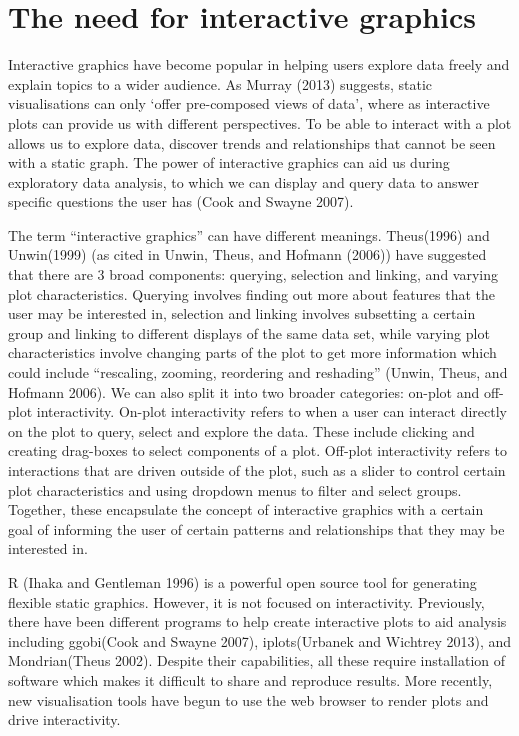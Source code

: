 \documentclass[11pt,]{report}
\begin{document}
\section{The need for interactive
graphics}\label{the-need-for-interactive-graphics}

Interactive graphics have become popular in helping users explore data
freely and explain topics to a wider audience. As Murray (2013)
suggests, static visualisations can only `offer pre-composed views of
data', where as interactive plots can provide us with different
perspectives. To be able to interact with a plot allows us to explore
data, discover trends and relationships that cannot be seen with a
static graph. The power of interactive graphics can aid us during
exploratory data analysis, to which we can display and query data to
answer specific questions the user has (Cook and Swayne 2007).

The term ``interactive graphics'' can have different meanings.
Theus(1996) and Unwin(1999) (as cited in Unwin, Theus, and Hofmann
(2006)) have suggested that there are 3 broad components: querying,
selection and linking, and varying plot characteristics. Querying
involves finding out more about features that the user may be interested
in, selection and linking involves subsetting a certain group and
linking to different displays of the same data set, while varying plot
characteristics involve changing parts of the plot to get more
information which could include ``rescaling, zooming, reordering and
reshading'' (Unwin, Theus, and Hofmann 2006). We can also split it into
two broader categories: on-plot and off-plot interactivity. On-plot
interactivity refers to when a user can interact directly on the plot to
query, select and explore the data. These include clicking and creating
drag-boxes to select components of a plot. Off-plot interactivity refers
to interactions that are driven outside of the plot, such as a slider to
control certain plot characteristics and using dropdown menus to filter
and select groups. Together, these encapsulate the concept of
interactive graphics with a certain goal of informing the user of
certain patterns and relationships that they may be interested in.

R (Ihaka and Gentleman 1996) is a powerful open source tool for
generating flexible static graphics. However, it is not focused on
interactivity. Previously, there have been different programs to help
create interactive plots to aid analysis including ggobi(Cook and Swayne
2007), iplots(Urbanek and Wichtrey 2013), and Mondrian(Theus 2002).
Despite their capabilities, all these require installation of software
which makes it difficult to share and reproduce results. More recently,
new visualisation tools have begun to use the web browser to render
plots and drive interactivity.
\end{document}
